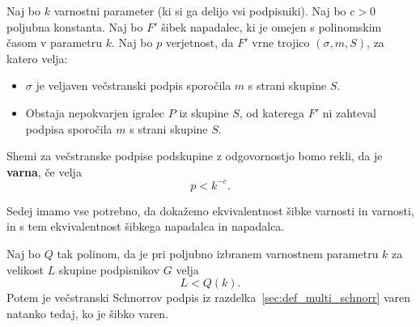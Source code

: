 \documentclass[isrm2, tisk]{fmfdelo}
\begin{document}
\begin{definicija}
    Naj bo $k$ varnostni parameter (ki si ga delijo vsi podpisniki). Naj bo $c > 0$ poljubna konstanta. 
    Naj bo $F'$ šibek napadalec, ki je omejen s polinomskim časom v parametru $k$. Naj bo $p$ 
    verjetnost, da $F'$ vrne trojico $(\sigma, m, S)$, za katero velja: 
    \begin{itemize}
        \item $\sigma$ je veljaven večstranski podpis sporočila $m$ s strani skupine $S$.
        \item Obstaja nepokvarjen igralec $P$ iz skupine $S$, od katerega $F'$ ni zahteval podpisa 
            sporočila $m$ s strani skupine $S$.
    \end{itemize}
    Shemi za večstranske 
    podpise podskupine z odgovornostjo bomo rekli, da je \textbf{varna}, če velja 
    $$ 
    p < k^{-c}.
    $$
\end{definicija}

Sedej imamo vse potrebno, da dokažemo ekvivalentnost šibke varnosti in varnosti, in s tem
ekvivalentnost šibkega napadalca in napadalca.

\begin{izrek}
\label{izr:šibka-varnost}
    Naj bo $Q$ tak polinom, da je pri poljubno izbranem varnostnem parametru $k$ za velikost $L$ 
    skupine podpisnikov $G$ velja
    $$
    L < Q(k).
    $$
    Potem je večstranski Schnorrov podpis iz razdelka~\ref{sec:def_multi_schnorr} varen natanko
    tedaj, ko je šibko varen.
\end{izrek}
\end{document}
